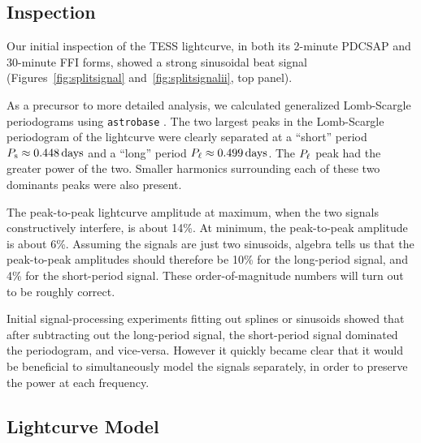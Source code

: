 \documentclass[12pt,twocolumn,tighten]{aastex62}
\begin{document}
\subsection{Inspection}

Our initial inspection of the TESS lightcurve, in both its 2-minute PDCSAP
and 30-minute FFI forms, showed a strong sinusoidal beat signal
(Figures~\ref{fig:splitsignal} and~\ref{fig:splitsignalii}, top panel).

As a precursor to more detailed analysis, we calculated generalized
Lomb-Scargle periodograms using \texttt{astrobase}
\citep{lomb_1976,scargle_studies_1982,vanderplas_periodograms_2015,bhatti_astrobase_2018}.
The two largest peaks in the Lomb-Scargle periodogram of the
lightcurve were clearly separated at a ``short'' period $P_{\rm s}
\approx 0.448\,{\rm days}$ and a ``long'' period $P_{\rm \ell} \approx
0.499\,{\rm days}$.  The $P_{\rm \ell}$ peak had the greater power of
the two.  Smaller harmonics surrounding each of these two dominants peaks
were also present.


The peak-to-peak lightcurve amplitude at maximum, when the two signals
constructively interfere, is about 14\%.  At minimum, the peak-to-peak
amplitude is about 6\%.  Assuming the signals are just two sinusoids,
algebra tells us that the peak-to-peak amplitudes should therefore be
10\% for the long-period signal, and 4\% for the short-period signal.
These order-of-magnitude numbers will turn out to be roughly correct.

Initial signal-processing experiments fitting out splines or sinusoids
showed that after subtracting out the long-period signal, the
short-period signal dominated the periodogram, and vice-versa.
However it quickly became clear that it would be beneficial to
simultaneously model the signals separately, in order to preserve the
power at each frequency.




\subsection{Lightcurve Model}
\end{document}

